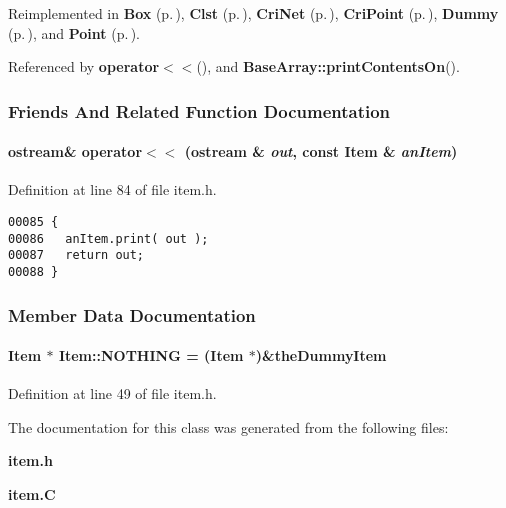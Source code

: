 Reimplemented in {\bf Box} {\rm (p.\,\pageref{Box_a7})}, {\bf Clst} {\rm (p.\,\pageref{Clst_a5})}, {\bf Cri\-Net} {\rm (p.\,\pageref{CriNet_a4})}, {\bf Cri\-Point} {\rm (p.\,\pageref{CriPoint_a5})}, {\bf Dummy} {\rm (p.\,\pageref{Dummy_a5})}, and {\bf Point} {\rm (p.\,\pageref{Point_a6})}.

Referenced by {\bf operator$<$$<$}(), and {\bf Base\-Array::print\-Contents\-On}().

\subsubsection{Friends And Related Function Documentation}
\label{Item_l0}
\paragraph{\setlength{\rightskip}{0pt plus 5cm}ostream\& operator$<$$<$ (ostream \& {\em out}, const Item \& {\em an\-Item})\hspace{0.3cm}{\tt  [friend]}}\hfill



Definition at line 84 of file item.h.\small\begin{verbatim}00085 {
00086   anItem.print( out );
00087   return out;
00088 }
\end{verbatim}\normalsize 


\subsubsection{Member Data Documentation}
\label{Item_p0}
\paragraph{\setlength{\rightskip}{0pt plus 5cm}Item $\ast$ Item::NOTHING = (Item $\ast$)\&{\bf the\-Dummy\-Item}\hspace{0.3cm}{\tt  [static]}}\hfill



Definition at line 49 of file item.h.

The documentation for this class was generated from the following files:\begin{CompactItemize}
\item 
{\bf item.h}\item 
{\bf item.C}\end{CompactItemize}
